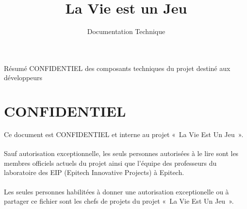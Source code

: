 \documentclass{life-fr}
\begin{document}
\title{La Vie est un Jeu}
\subtitle{Documentation Technique}


\summary
{
  Résumé CONFIDENTIEL des composants techniques du projet destiné aux développeurs
}

\maketitle


\chapter*{CONFIDENTIEL}
{
  Ce document est CONFIDENTIEL et interne au projet «~La Vie Est Un Jeu~».\\
  \\
  Sauf autorisation exceptionnelle, les seuls personnes autorisées à le lire
  sont les membres officiels actuels du projet ainsi que l'équipe des
  professeurs du laboratoire des EIP (Epitech Innovative Projects) à Epitech.\\
  \\
  Les seules personnes habilitées à donner une autorisation exceptionelle
  ou à partager ce fichier sont les chefs de projets du projet «~La Vie
  Est Un Jeu~».
}


\authorspage

\end{document}
